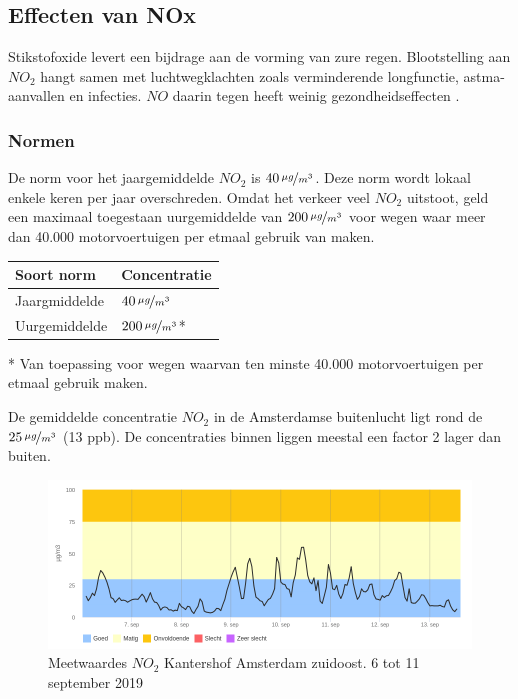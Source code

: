 \documentclass[a4paper, 11pt]{article} %
\begin{document}
\subsection{Effecten van NOx}
Stikstofoxide levert een bijdrage aan de vorming van zure regen. Blootstelling aan $NO_2$ hangt samen met luchtwegklachten zoals verminderende longfunctie, astma-aanvallen en infecties. $NO$ daarin tegen heeft weinig gezondheidseffecten \cite{NO2_Amsterdam}. 


\subsubsection{Normen}
De norm voor het jaargemiddelde $NO_2$ is 	$40\,\nicefrac{\mu g}{m^{3}}$. Deze norm wordt lokaal enkele keren per jaar overschreden. Omdat het verkeer veel $NO_2$ uitstoot, geld een maximaal toegestaan uurgemiddelde van $200\,\nicefrac{\mu g}{m^{3}}$ voor wegen waar meer dan 40.000 motorvoertuigen per etmaal gebruik van maken.

\begin{center}
	\begin{tabular}{ | m{5cm} | m{5cm}| } 
		\hline
		Soort norm & Concentratie \\
		\hline
		Jaargmiddelde & $40\,\nicefrac{\mu g}{m^{3}}$
		\\ 
		\hline
		Uurgemiddelde & $200\,\nicefrac{\mu g}{m^{3}}$* 
		\\ 
		\hline
	\end{tabular}
\end{center}

\begin{footnotesize} 
	* Van toepassing voor wegen waarvan ten minste 40.000 motorvoertuigen per etmaal gebruik maken.
\end{footnotesize}

De gemiddelde concentratie $NO_2$ in de Amsterdamse buitenlucht ligt rond de $25\,\nicefrac{\mu g}{m^{3}}$ (13 ppb). De concentraties binnen liggen meestal een factor 2 lager dan buiten. 

\begin{figure}
	\centering
	\includegraphics[width=.9\linewidth]{../Old/NO2_doc/amsterdam.png}
	\caption{Meetwaardes $NO_2$ Kantershof Amsterdam zuidoost. 6 tot 11 september 2019 \cite{grafiek}}
	\label{fig:grafiek}
\end{figure}
\end{document}
